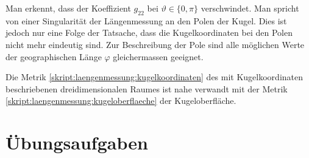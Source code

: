 Man erkennt, dass der Koeffizient $g_{22}$ bei $\vartheta \in\{0,\pi\}$
verschwindet.
Man spricht von einer Singularität der Längenmessung an den Polen der Kugel.
Dies ist jedoch nur eine Folge der Tatsache, dass die Kugelkoordinaten
bei den Polen nicht mehr eindeutig sind.
Zur Beschreibung der Pole sind alle möglichen Werte der geographischen
Länge $\varphi$ gleichermassen geeignet.

Die Metrik 
\eqref{skript:laengenmessung:kugelkoordinaten}
des mit Kugelkoordinaten beschriebenen dreidimensionalen Raumes
ist nahe verwandt mit der Metrik
\eqref{skript:laengenmessung:kugeloberflaeche}
der Kugeloberfläche.



\section*{Übungsaufgaben}

